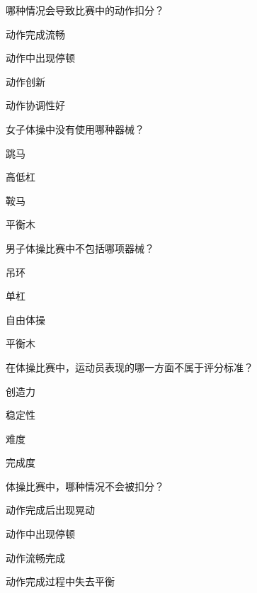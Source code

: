 \documentclass{exam-zh}
\begin{document}
    \begin{question}[points = 2]
    哪种情况会导致比赛中的动作扣分？
    \begin{choices}
    \item 动作完成流畅
    \item 动作中出现停顿
    \item 动作创新
    \item 动作协调性好
    \end{choices}
    \end{question}
    
    \begin{question}[points = 2]
    女子体操中没有使用哪种器械？
    \begin{choices}
    \item 跳马
    \item 高低杠
    \item 鞍马
    \item 平衡木
    \end{choices}
    \end{question}
    
    \begin{question}[points = 2]
    男子体操比赛中不包括哪项器械？
    \begin{choices}
    \item 吊环
    \item 单杠
    \item 自由体操
    \item 平衡木
    \end{choices}
    \end{question}
    
    \begin{question}[points = 2]
    在体操比赛中，运动员表现的哪一方面不属于评分标准？
    \begin{choices}
    \item 创造力
    \item 稳定性
    \item 难度
    \item 完成度
    \end{choices}
    \end{question}
    
    \begin{question}[points = 2]
    体操比赛中，哪种情况不会被扣分？
    \begin{choices}
    \item 动作完成后出现晃动
    \item 动作中出现停顿
    \item 动作流畅完成
    \item 动作完成过程中失去平衡
    \end{choices}
    \end{question}
    
\end{document}
